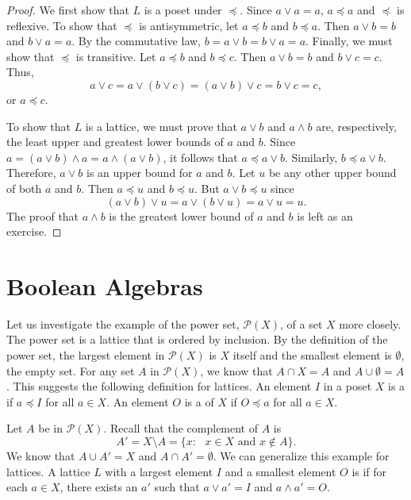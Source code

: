  
\begin{proof}
We first show that $L$ is a poset under $\preceq$. Since $a \vee a =
a$, $a \preceq a$ and $\preceq$ is reflexive. To show that $\preceq$
is antisymmetric, let $a \preceq b$ and $b \preceq a$. Then $a \vee b
= b$ and $b \vee a = a$.  By the commutative law, $b = a \vee b
= b \vee a = a$.   Finally, we must show that $\preceq$ is
transitive. Let $a \preceq b$ and $b \preceq c$. Then $a \vee b = b$
and $b \vee c = c$.  Thus,
\[
a \vee c = a \vee (b \vee c ) = ( a \vee b) \vee c = b \vee c = c,
\]
or $a \preceq c$.
 
To show that $L$ is a lattice, we must prove that $a \vee b$ and $a
\wedge b$ are, respectively, the least upper and greatest lower bounds
of $a$ and $b$. Since $a=(a \vee b) \wedge a = a \wedge (a \vee b)$,
it follows that $a \preceq a \vee b$.  Similarly, $b \preceq a \vee
b$. Therefore, $a \vee b$ is an upper bound for $a$ and $b$. Let $u$
be any other upper bound of both $a$ and $b$. Then $a \preceq u$ and
$b \preceq u$. But $a \vee b \preceq u$ since 
\[
(a \vee b) \vee u = a \vee (b \vee u) = a \vee u = u.
\]
The proof that $a \wedge b$ is the greatest lower bound of $a$ and
$b$ is left as an exercise.
\end{proof}
 
 
 
\section{Boolean Algebras}
 
 
Let us investigate the example of the power set, ${\mathcal P}(X)$, of a
set $X$ more  closely. The power set is a lattice that is  ordered by
inclusion. By the definition of the power set, the largest element in
${\mathcal P}(X)$ is $X$ itself and the smallest element is $\emptyset$,
the empty set. For any set $A$ in ${\mathcal P}(X)$, we know that $A \cap
X = A$ and $A \cup \emptyset = A$. This suggests the following
definition for lattices. An element $I$\label{notelargeposet} 
in a poset $X$ is a  if $a \preceq I$ for
all $a \in X$.  An element $O$\label{notesmallposet} 
 is a   of $X$ if $O \preceq a$ for
all $a \in X$.  
 
 
Let $A$ be in ${\mathcal P}(X)$. Recall that the complement of $A$ is
\[
A' = X \setminus A = \{ x : \mbox{ $x \in X$ and $x \notin A$}  \}.
\]
We know that $A \cup A' = X$ and $A \cap A' = \emptyset$. We can
generalize this example for lattices. A lattice $L$ with a largest
element $I$ and a smallest element $O$ is  if for each $a \in X$, there
exists an $a'$\label{notedlatticecomp} 
such that $a \vee a' = I$ and $a \wedge a' = O$.
 
